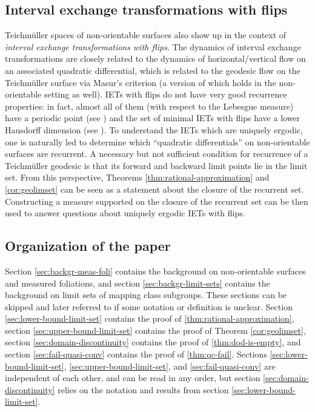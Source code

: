 \documentclass[12pt, reqno]{amsart}
\begin{document}
\subsection*{Interval exchange transformations with flips}

Teichm\"uller spaces of non-orientable surfaces also show up in the context of \emph{interval exchange transformations with flips}.
The dynamics of interval exchange transformations are closely related to the dynamics of horizontal/vertical flow on an associated quadratic differential, which is related to the geodesic flow on the Teichm\"uller surface via Masur's criterion (a version of which holds in the non-orientable setting as well).
IETs with flips do not have very good recurrence properties: in fact, almost all of them (with respect to the Lebesgue measure) have a periodic point (see \cite{nogueira_1989}) and the set of minimal IETs with flips have a lower Hausdorff dimension (see \cite{skripchenko2018hausdorff}).
To understand the IETs which are uniquely ergodic, one is naturally led to determine which ``quadratic differentials'' on non-orientable surfaces are recurrent.
A necessary but not sufficient condition for recurrence of a Teichm\"uller geodesic is that its forward and backward limit points lie in the limit set.
From this perspective, Theorems \ref{thm:rational-approximation} and \ref{cor:geolimset} can
be seen as a statement about the closure of the recurrent set.
Constructing a measure supported on the closure of the recurrent set can be then used to answer questions about uniquely ergodic IETs with flips.

\subsection*{Organization of the paper}
Section \ref{sec:backgr-meas-foli} contains the background on non-orientable surfaces and measured foliations, and section \ref{sec:backgr-limit-sets} contains the background on limit sets of mapping class subgroups.
These sections can be skipped and later referred to if some notation or definition is unclear.
Section \ref{sec:lower-bound-limit-set} contains the proof of \autoref{thm:rational-approximation}, section \ref{sec:upper-bound-limit-set} contains the proof of Theorem \ref{cor:geolimset}, section \ref{sec:domain-discontinuity} contains the proof of \autoref{thm:dod-is-empty}, and section \ref{sec:fail-quasi-conv} contains the proof of \autoref{thm:qc-fail}.
Sections \ref{sec:lower-bound-limit-set}, \ref{sec:upper-bound-limit-set}, and \ref{sec:fail-quasi-conv} are independent of each other, and can be read in any order, but section \ref{sec:domain-discontinuity} relies on the notation and results from section \ref{sec:lower-bound-limit-set}.
\end{document}
